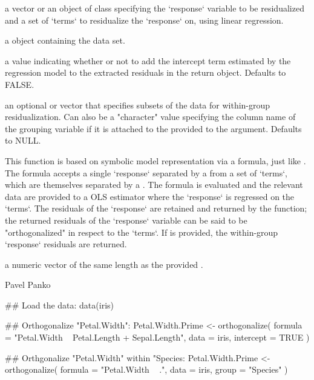 \documentclass[a4paper]{book}
\begin{document}
\begin{Arguments}
\begin{ldescription}
\item[\code{formula}] 
a  vector or an object of class  specifying the `response`
variable to be residualized and a set of `terms` to residualize the
`response` on, using linear regression. 

\item[\code{data}] 
a  object containing the data set.  

\item[\code{intercept}] 
a  value indicating whether or not to 
add the intercept term estimated by the regression model to the
extracted residuals in the return object. Defaults to FALSE.

\item[\code{group}] 
an optional  or  vector that
specifies subsets of the data for within-group residualization. Can
also be a "character" value specifying the column name of the
grouping variable if it is attached to the 
provided to the  argument. Defaults to NULL.  

\end{ldescription}
\end{Arguments}
%
\begin{Details}\relax
This function is based on symbolic model
representation via a formula, just like . The
formula accepts a single `response` separated by a  from a set of `terms`, which are
themselves separated by a \code{+}. The formula is evaluated and the
relevant data are provided to a OLS estimator where the `response`
is regressed on the `terms`. The residuals of the `response` are 
retained and returned by the function; the returned residuals of the
`response` variable can be said to be "orthogonalized" in respect to the `terms`. 
If  is provided, the within-group `response` residuals
are returned. 
\end{Details}
%
\begin{Value}
a numeric vector of the same length as the provided . 
\end{Value}
%
\begin{Author}\relax
Pavel Panko
\end{Author}
%
\begin{Examples}
\begin{ExampleCode}
## Load the data:
data(iris)

## Orthogonalize "Petal.Width":
Petal.Width.Prime <- orthogonalize(
	formula   = "Petal.Width ~ Petal.Length + Sepal.Length", 
	data      = iris, 
	intercept = TRUE
)

## Orthgonalize "Petal.Width" within "Species:
Petal.Width.Prime <- orthogonalize(
	formula = "Petal.Width ~ .", 
	data    = iris, 
	group   = "Species" 
)
\end{ExampleCode}
\end{Examples}
\printindex{}
\end{document}
